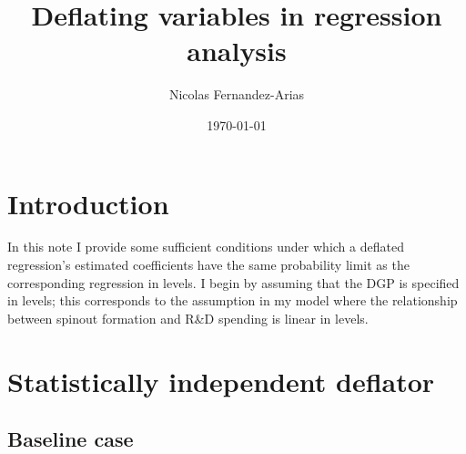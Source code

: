 \documentclass[11pt,english]{article}
\title{Deflating variables in regression analysis}
\author{Nicolas Fernandez-Arias}
\date{\today}
\theoremstyle{definition}
\begin{document}
	
\maketitle

\section{Introduction}

In this note I provide some sufficient conditions under which a deflated regression's estimated coefficients have the same probability limit as the corresponding regression in levels. I begin by assuming that the DGP is specified in levels; this corresponds to the assumption in my model where the relationship between spinout formation and R\&D spending is linear in levels.

\section{Statistically independent deflator}

\subsection{Baseline case}
\end{document}

